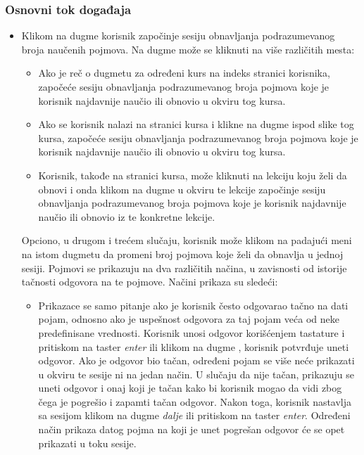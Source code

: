 \subsubsection{Osnovni tok događaja}
\begin{itemize}
  \item
  Klikom na dugme  korisnik započinje sesiju obnavljanja podrazumevanog broja naučenih pojmova.
  Na dugme  može se kliknuti na više različitih mesta:
  \begin{itemize}
    \item
    Ako je reč o dugmetu za određeni kurs na indeks stranici korisnika, započeće sesiju obnavljanja podrazumevanog broja pojmova koje je korisnik najdavnije naučio ili obnovio u okviru tog kursa.
    \item
    Ako se korisnik nalazi na stranici kursa i klikne na dugme  ispod slike tog kursa, započeće sesiju obnavljanja podrazumevanog broja pojmova koje je korisnik najdavnije naučio ili obnovio u okviru tog kursa.
    \item
    Korisnik, takođe na stranici kursa, može kliknuti na lekciju koju želi da obnovi i onda klikom na dugme  u okviru te lekcije započinje sesiju obnavljanja podrazumevanog broja  pojmova koje je korisnik najdavnije naučio ili obnovio iz te konkretne lekcije.
  \end{itemize}
  Opciono, u drugom i trećem slučaju, korisnik može klikom na padajući meni na istom dugmetu da promeni broj pojmova koje želi da obnavlja u jednoj sesiji.
  Pojmovi se prikazuju na dva različitih načina, u zavisnosti od istorije tačnosti odgovora na te pojmove.
  Načini prikaza su sledeći:
  \begin{itemize}
    \item
    Prikazace se samo pitanje ako je korisnik često odgovarao tačno na dati pojam, odnosno ako je uspešnost odgovora za taj pojam veća od neke predefinisane vrednosti.
    Korisnik unosi odgovor korišćenjem tastature i pritiskom na taster \emph{enter} ili klikom na dugme , korisnik potvrđuje uneti odgovor.
    Ako je odgovor bio tačan, određeni pojam se više neće prikazati u okviru te sesije ni na jedan način.
    U slučaju da nije tačan, prikazuju se uneti odgovor i onaj koji je tačan kako bi korisnik mogao da vidi zbog čega je pogrešio i zapamti tačan odgovor.
    Nakon toga, korisnik nastavlja sa sesijom klikom na dugme \emph{dalje} ili pritiskom na taster \emph{enter}.
    Određeni način prikaza datog pojma na koji je unet pogrešan odgovor će se opet prikazati u toku sesije.

\end{itemize}
\end{itemize}
